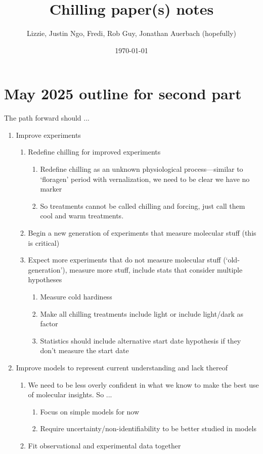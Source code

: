 \documentclass[11pt,letter]{article}
\begin{document}

\renewcommand{\refname}{\CHead{}}

\title{Chilling paper(s) notes}
\author{Lizzie, Justin Ngo, Fredi, Rob Guy, Jonathan Auerbach (hopefully)} %
\date{\today}
\maketitle
\tableofcontents
\section{May 2025 outline for second part} 

The path forward should ...
\begin{enumerate}
\item Improve experiments
\begin{enumerate}
\item Redefine chilling for improved experiments
\begin{enumerate}
\item Redefine chilling as an unknown physiological process---similar to `floragen' period with vernalization, we need to be clear we have no marker %
\item So treatments cannot be called chilling and forcing, just call them cool and warm treatments. 
\end{enumerate}
\item Begin a new generation of experiments that measure molecular stuff (this is critical)
\item Expect more experiments that do not measure molecular stuff (`old-generation'), measure more stuff, include stats that consider multiple hypotheses
\begin{enumerate}
\item Measure cold hardiness
\item Make all chilling treatments include light or include light/dark as factor
\item Statistics should include alternative start date hypothesis if they don't measure the start date
\end{enumerate}
\end{enumerate}
\item Improve models to represent current understanding and lack thereof 
\begin{enumerate}
\item We need to be less overly confident in what we know to make the best use of molecular insights. So ...
\begin{enumerate}
\item Focus on simple models for now
\item Require uncertainty/non-identifiability to be better studied in models 
\end{enumerate}
\item Fit observational and experimental data together
\end{enumerate}
\end{enumerate}
\end{document}
